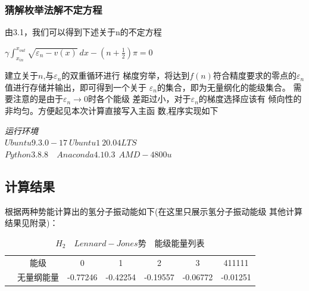 \documentclass[11pt, a4paper, oneside]{ctexart}
\begin{document}
{{{{\begin{flushright}
    \end{flushright}


}
    
\subsubsection{猜解枚举法解不定方程}

{
    由3.1，我们可以得到下述关于n的不定方程
    \begin{center}
        $\gamma \int ^{x_{out}} _{x_{in}}\sqrt{\varepsilon_n-v(x)}\ dx-
        (n+\frac 1 2 )\pi=0$
    \end{center}


    建立关于$n$,与$\varepsilon_n$的双重循环进行
    梯度穷举，将达到$f(n)$符合精度要求的零点的$
    \varepsilon_n$值进行存储并输出，即可得到一个关于
    $\varepsilon_n$的集合，即为无量纲化的能级集合。
    需要注意的是由于$\varepsilon_n\to 0$时各个能级
    差距过小，对于$\varepsilon_n$的梯度选择应该有
    倾向性的非均匀。方便起见本次计算直接写入主函
    数,程序实现如下
    {
    
    
    
    \begin{flushright}
    \scriptsize\emph{运行环境\\$Ubuntu 9.3.0-17\ Ubuntu1~20.04LTS$}\\
    \scriptsize\emph{$Python 3.8.8$\ \ $Anaconda 4.10.3\ \  AMD-4800u$}
        
    \end{flushright}
}

}

\subsection{计算结果}
{
    根据两种势能计算出的氢分子振动能如下(在这里只展示氢分子振动能级
    其他计算结果见附录)：
    {
\begin{table}[!h]
    \caption{$H_2 \quad Lennard-Jones$势\ \ 能级能量列表} 
    \centering
    \begin{tabular}{@{}ccccccc@{}}
    \toprule
    \centering
    \multirow{2}{*}{} & 能级    & 0        & 1        & 2        & 3        & 411111        \\ \cmidrule(){1-7} 
                                     & 无量纲能量 & -0.77246 & -0.42254 & -0.19557 & -0.06772 & -0.01251 \\ \bottomrule
    \end{tabular}
    \end{table}
    }

}}}}
\end{document}
